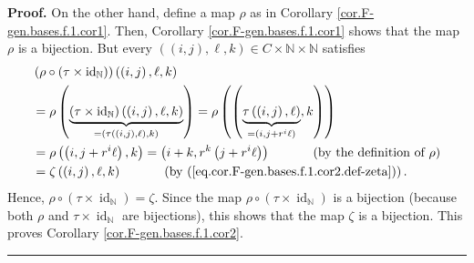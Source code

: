 \documentclass[numbers=enddot,12pt,final,onecolumn,notitlepage]{scrartcl}%
\theoremstyle{definition}
\newenvironment{proof}[1][Proof]{\noindent\textbf{#1.} }{\ \rule{0.5em}{0.5em}}
\begin{document}
\begin{proof}
On the other hand, define a map $\rho$ as in Corollary
\ref{cor.F-gen.bases.f.1.cor1}. Then, Corollary \ref{cor.F-gen.bases.f.1.cor1}
shows that the map $\rho$ is a bijection. But every $\left(  \left(
i,j\right)  ,\ell,k\right)  \in C\times\mathbb{N}\times\mathbb{N}$ satisfies%
\begin{align*}
&  \left(  \rho\circ\left(  \tau\times\operatorname*{id}\nolimits_{\mathbb{N}%
}\right)  \right)  \left(  \left(  i,j\right)  ,\ell,k\right) \\
&  =\rho\left(  \underbrace{\left(  \tau\times\operatorname*{id}%
\nolimits_{\mathbb{N}}\right)  \left(  \left(  i,j\right)  ,\ell,k\right)
}_{=\left(  \tau\left(  \left(  i,j\right)  ,\ell\right)  ,k\right)  }\right)
=\rho\left(  \left(  \underbrace{\tau\left(  \left(  i,j\right)  ,\ell\right)
}_{=\left(  i,j+r^{i}\ell\right)  },k\right)  \right) \\
&  =\rho\left(  \left(  i,j+r^{i}\ell\right)  ,k\right)  =\left(
i+k,r^{k}\left(  j+r^{i}\ell\right)  \right)  \ \ \ \ \ \ \ \ \ \ \left(
\text{by the definition of }\rho\right) \\
&  =\zeta\left(  \left(  i,j\right)  ,\ell,k\right)
\ \ \ \ \ \ \ \ \ \ \left(  \text{by
(\ref{eq.cor.F-gen.bases.f.1.cor2.def-zeta})}\right)  .
\end{align*}
Hence, $\rho\circ\left(  \tau\times\operatorname*{id}\nolimits_{\mathbb{N}%
}\right)  =\zeta$. Since the map $\rho\circ\left(  \tau\times
\operatorname*{id}\nolimits_{\mathbb{N}}\right)  $ is a bijection (because
both $\rho$ and $\tau\times\operatorname*{id}\nolimits_{\mathbb{N}}$ are
bijections), this shows that the map $\zeta$ is a bijection. This proves
Corollary \ref{cor.F-gen.bases.f.1.cor2}.
\end{proof}
\end{document}
